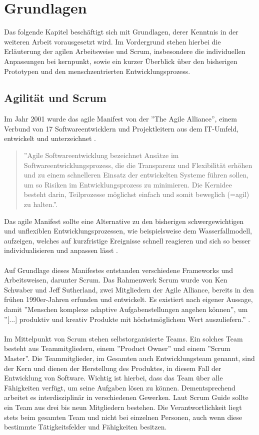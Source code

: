 \chapter{Grundlagen}
\label{cha:Grundlagen}
Das folgende Kapitel beschäftigt sich mit Grundlagen, derer Kenntnis in der weiteren Arbeit vorausgesetzt wird. Im Vordergrund stehen hierbei die Erläuterung der agilen Arbeitsweise und Scrum, insbesondere die individuellen Anpassungen bei kernpunkt, sowie ein kurzer Überblick über den bisherigen Prototypen und den menschzentrierten Entwicklungsprozess.

\section{Agilität und Scrum}
\label{sec:agilitaet_scrum}
Im Jahr 2001 wurde das agile Manifest von der ''The Agile Alliance'', einem Verbund von 17 Softwareentwicklern und Projektleitern aus dem IT-Umfeld, entwickelt und unterzeichnet \cite{agilemanifestosignatories, agilemanifestohistory}. 
\begin{quote}
''Agile Softwareentwicklung bezeichnet Ansätze im Softwareentwicklungsprozess, die die Transparenz und Flexibilität erhöhen und zu einem schnelleren Einsatz der entwickelten Systeme führen sollen, um so Risiken im Entwicklungsprozess zu minimieren. Die Kernidee besteht darin, Teilprozesse möglichst einfach und somit beweglich (=agil) zu halten.''\cite{definitionagil}.
\end{quote}
Das agile Manifest sollte eine Alternative zu den bisherigen schwergewichtigen und unflexiblen Entwicklungsprozessen, wie beispielsweise dem Wasserfallmodell, aufzeigen, welches auf kurzfristige Ereignisse schnell reagieren und sich so besser individualisieren und anpassen lässt \cite{agilemanifestohistory}. \\ \\
Auf Grundlage dieses Manifestes entstanden verschiedene Frameworks und Arbeitsweisen, darunter Scrum. Das Rahmenwerk Scrum wurde von Ken Schwaber und Jeff Sutherland, zwei Mitgliedern der Agile Alliance, bereits in den frühen 1990er-Jahren erfunden und entwickelt. Es existiert nach eigener Aussage, damit  ''Menschen komplexe adaptive Aufgabenstellungen angehen können'', um ''[...] produktiv und kreativ Produkte mit höchstmöglichem Wert auszuliefern.'' \cite{scrumguide}.
\\ \\
Im Mittelpunkt von Scrum stehen selbstorganisierte Teams. Ein solches Team besteht aus Teammitgliedern, einem ''Product Owner'' und einem ''Scrum Master''. Die Teammitglieder, im Gesamten auch Entwicklungsteam genannt, sind der Kern und dienen der Herstellung des Produktes, in diesem Fall der Entwicklung von Software. Wichtig ist hierbei, dass das Team über alle Fähigkeiten verfügt, um seine Aufgaben lösen zu können. Dementsprechend arbeitet es interdisziplinär in verschiedenen Gewerken. Laut Scrum Guide sollte ein Team aus drei bis neun Mitgliedern bestehen. Die Verantwortlichkeit liegt stets beim gesamten Team und nicht bei einzelnen Personen, auch wenn diese bestimmte Tätigkeitsfelder und Fähigkeiten besitzen.
